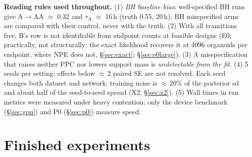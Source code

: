 \documentclass[10pt,a4paper]{article}
\newcommand{\tA}{$\tau_A$}
\begin{document}
\begin{keybox}
\textbf{Reading rules used throughout.}
(1) \emph{BH baseline bias}: well-specified BH runs give A$\to$AA $\approx$ 0.32 and \tA{} $\approx$ 16\,h (truth 0.55, 20\,h); BH misspecified arms are compared with their control, never with the truth.
(2) With all transitions free, B's row is not identifiable from endpoint counts at feasible designs (E0; practically, not structurally: the exact likelihood recovers it at 4096 organoids per endpoint, where NPE does not, \S\ref{sec:exact}; \S\ref{sec:e0large}).
(3) A misspecification that raises neither PPC nor lowers support mass is \emph{undetectable from the fit}.
(4) 5 seeds per setting: effects below $\approx$\,2 paired SE are not resolved. Each seed changes both dataset and network; training noise is $\approx$\,20\% of the posterior sd and about half of the seed-to-seed spread (X2, \S\ref{sec:x2}).
(5) Wall times in run metrics were measured under heavy contention; only the device benchmark (\S\ref{sec:gpu}) and P0 (\S\ref{sec:p0}) measure speed.
\end{keybox}

\clearpage
\part{Finished experiments}\label{part:finished}

\end{document}
